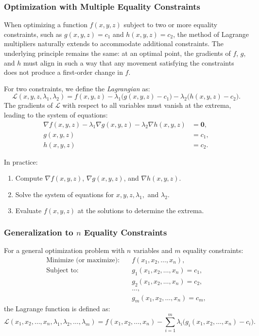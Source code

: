 \subsubsection*{Optimization with Multiple Equality Constraints} 

\noindent When optimizing a function \( f(x, y, z) \) subject to two or more equality constraints, such as \( g(x, y, z) = c_1 \) and \( h(x, y, z) = c_2 \), the method of Lagrange multipliers naturally extends to accommodate additional constraints. The underlying principle remains the same: at an optimal point, the gradients of \( f \), \( g \), and \( h \) must align in such a way that any movement satisfying the constraints does not produce a first-order change in \( f \).

\noindent For two constraints, we define the \textit{Lagrangian} as:
\[
\mathcal{L}(x, y, z, \lambda_1, \lambda_2) = f(x, y, z) - \lambda_1 \big(g(x, y, z) - c_1\big) - \lambda_2 \big(h(x, y, z) - c_2\big).
\]
\noindent The gradients of \( \mathcal{L} \) with respect to all variables must vanish at the extrema, leading to the system of equations:
\[
\begin{aligned}
    \nabla f(x, y, z) - \lambda_1 \nabla g(x, y, z) - \lambda_2 \nabla h(x, y, z) &= \mathbf{0}, \\
    g(x, y, z) &= c_1, \\
    h(x, y, z) &= c_2.
\end{aligned}
\]

\noindent In practice:
\begin{enumerate}
    \item Compute \( \nabla f(x, y, z) \), \( \nabla g(x, y, z) \), and \( \nabla h(x, y, z) \).
    \item Solve the system of equations for \( x, y, z, \lambda_1, \) and \( \lambda_2 \).
    \item Evaluate \( f(x, y, z) \) at the solutions to determine the extrema.
\end{enumerate}

\subsubsection*{Generalization to \( n \) Equality Constraints}

\noindent For a general optimization problem with \( n \) variables and \( m \) equality constraints:
\[
\begin{aligned}
    \text{Minimize (or maximize):} & \quad f(x_1, x_2, \dots, x_n), \\
    \text{Subject to:} & \quad g_1(x_1, x_2, \dots, x_n) = c_1, \\
    & \quad g_2(x_1, x_2, \dots, x_n) = c_2, \\
    & \quad \dots, \\
    & \quad g_m(x_1, x_2, \dots, x_n) = c_m,
\end{aligned}
\]
the Lagrange function is defined as:
\[
\mathcal{L}(x_1, x_2, \dots, x_n, \lambda_1, \lambda_2, \dots, \lambda_m) = f(x_1, x_2, \dots, x_n) - \sum_{i=1}^m \lambda_i \big(g_i(x_1, x_2, \dots, x_n) - c_i\big).
\]


